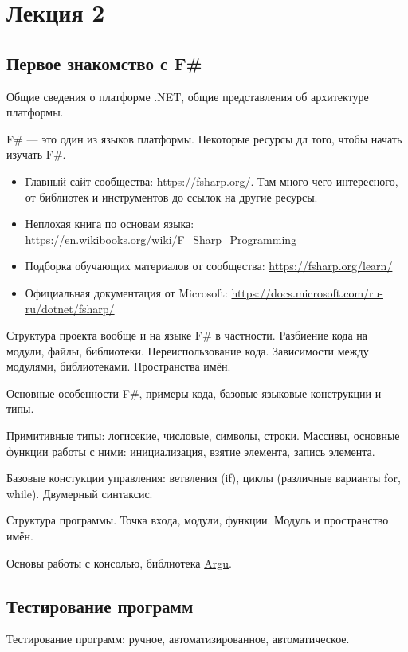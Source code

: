 \section{Лекция 2}

\subsection{Первое знакомство с F\#}

    Общие сведения о платформе .NET, общие представления об архитектуре платформы.

    F\# --- это один из языков платформы. 
    Некоторые ресурсы дл того, чтобы начать изучать F\#.
    \begin{itemize}
    	\item Главный сайт сообщества: \url{https://fsharp.org/}. Там много чего интересного, от библиотек и инструментов до ссылок на другие ресурсы. 
    	\item Неплохая книга по основам языка: \url{https://en.wikibooks.org/wiki/F_Sharp_Programming}
    	\item Подборка обучающих материалов от сообщества: \url{https://fsharp.org/learn/}
    	\item Официальная документация от Microsoft: \url{https://docs.microsoft.com/ru-ru/dotnet/fsharp/}
    \end{itemize}

    Структура проекта вообще и на языке F\# в частности. Разбиение кода на модули, файлы, библиотеки. Переиспользование кода. Зависимости между модулями, библиотеками. Пространства имён.


    Основные особенности F\#, примеры кода, базовые языковые конструкции и типы.


    Примитивные типы: логисекие, числовые, символы, строки.
    Массивы, основные функции работы с ними: инициализация, взятие элемента, запись элемента.

    Базовые констукции управления: ветвления (if), циклы (различные варианты for, while). 
    Двумерный синтаксис.

    Структура программы. Точка входа, модули, функции. Модуль и пространство имён.

    Основы работы с консолью, библиотека \href{https://fsprojects.github.io/Argu/}{Argu}. 

\subsection{Тестирование программ}
    Тестирование программ: ручное, автоматизированное, автоматическое. 

